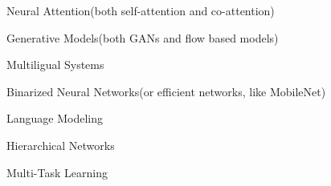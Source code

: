 

\begin{cventries}

\vspace{5mm}

  \begin{cvitems} %
  	\item {Neural Attention(both self-attention and co-attention)}
    \item {Generative Models(both GANs and flow based models)}
  	\item {Multiligual Systems}
    \item {Binarized Neural Networks(or efficient networks, like MobileNet)}
    \item {Language Modeling}
  	\item {Hierarchical Networks}
  	\item {Multi-Task Learning}
   \end{cvitems}
    
\end{cventries}
